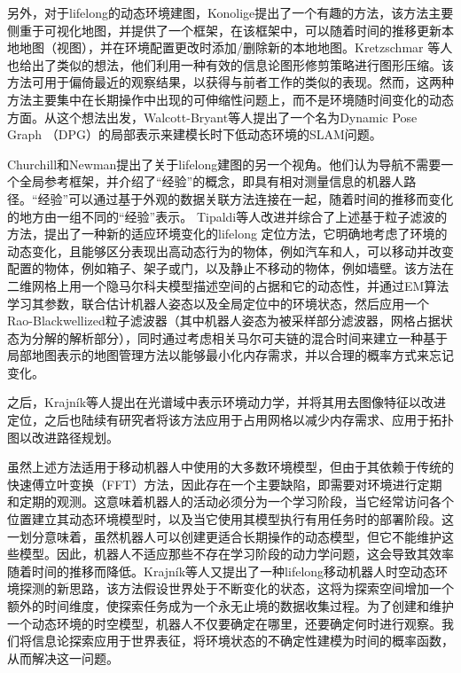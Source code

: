 另外，对于lifelong的动态环境建图，Konolige\cite{Konolige2009Towards}提出了一个有趣的方法，该方法主要侧重于可视化地图，并提供了一个框架，在该框架中，可以随着时间的推移更新本地地图（视图），并在环境配置更改时添加/删除新的本地地图。Kretzschmar\cite{Kretzschmar2012Information} 等人也给出了类似的想法，他们利用一种有效的信息论图形修剪策略进行图形压缩。该方法可用于偏倚最近的观察结果，以获得与前者工作的类似的表现。然而，这两种方法主要集中在长期操作中出现的可伸缩性问题上，而不是环境随时间变化的动态方面。从这个想法出发，Walcott-Bryant\cite{Walcott2012Dynamic}等人提出了一个名为Dynamic Pose Graph （DPG）的局部表示来建模长时下低动态环境的SLAM问题。

Churchill和Newman\cite{Churchill2012Practice}提出了关于lifelong建图的另一个视角。他们认为导航不需要一个全局参考框架，并介绍了“经验”的概念，即具有相对测量信息的机器人路径。“经验”可以通过基于外观的数据关联方法连接在一起，随着时间的推移而变化的地方由一组不同的“经验”表示。
Tipaldi等人\cite{Tipaldi2013Lifelong}改进并综合了上述基于粒子滤波的方法，提出了一种新的适应环境变化的lifelong 定位方法，它明确地考虑了环境的动态变化，且能够区分表现出高动态行为的物体，例如汽车和人，可以移动并改变配置的物体，例如箱子、架子或门，以及静止不移动的物体，例如墙壁。该方法在二维网格上用一个隐马尔科夫模型描述空间的占据和它的动态性，并通过EM算法学习其参数，联合估计机器人姿态以及全局定位中的环境状态，然后应用一个Rao-Blackwellized粒子滤波器（其中机器人姿态为被采样部分滤波器，网格占据状态为分解的解析部分），同时通过考虑相关马尔可夫链的混合时间来建立一种基于局部地图表示的地图管理方法以能够最小化内存需求，并以合理的概率方式来忘记变化。

之后，Krajník等人\cite{Krajn2014Spectral}提出在光谱域中表示环境动力学，并将其用去图像特征以改进定位，之后也陆续有研究者将该方法应用于占用网格以减少内存需求、应用于拓扑图以改进路径规划。

虽然上述方法适用于移动机器人中使用的大多数环境模型，但由于其依赖于传统的快速傅立叶变换（FFT）方法，因此存在一个主要缺陷，即需要对环境进行定期和定期的观测。这意味着机器人的活动必须分为一个学习阶段，当它经常访问各个位置建立其动态环境模型时，以及当它使用其模型执行有用任务时的部署阶段。这一划分意味着，虽然机器人可以创建更适合长期操作的动态模型，但它不能维护这些模型。因此，机器人不适应那些不存在学习阶段的动力学问题，这会导致其效率随着时间的推移而降低。Krajník等人\cite{Krajnik2015Life}又提出了一种lifelong移动机器人时空动态环境探测的新思路，该方法假设世界处于不断变化的状态，这将为探索空间增加一个额外的时间维度，使探索任务成为一个永无止境的数据收集过程。为了创建和维护一个动态环境的时空模型，机器人不仅要确定在哪里，还要确定何时进行观察。我们将信息论探索应用于世界表征，将环境状态的不确定性建模为时间的概率函数，从而解决这一问题。

